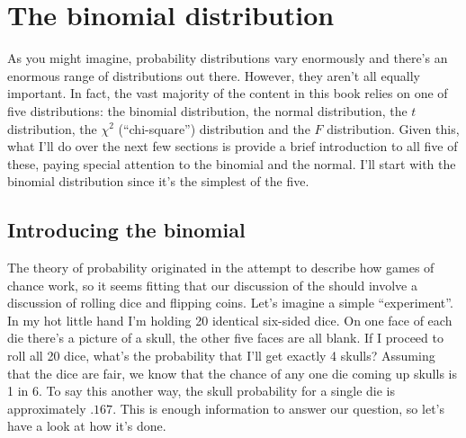 \section{The binomial distribution\label{sec:binomial}}

As you might imagine, probability distributions vary enormously and there's an enormous range of distributions out there. However, they aren't all equally important. In fact, the vast majority of the content in this book relies on one of five distributions: the binomial distribution, the normal distribution, the $t$ distribution, the $\chi^2$ (``chi-square'') distribution and the $F$ distribution. Given this, what I'll do over the next few sections is provide a brief introduction to all five of these, paying special attention to the binomial and the normal. I'll start with the binomial distribution since it's the simplest of the five.

\subsection{Introducing the binomial}

The theory of probability originated in the attempt to describe how games of chance work, so it seems fitting that our discussion of the  should involve a discussion of rolling dice and flipping coins. Let's imagine a simple ``experiment''. In my hot little hand I'm holding 20 identical six-sided dice. On one face of each die there's a picture of a skull, the other five faces are all blank. If I proceed to roll all 20 dice, what's the probability that I'll get exactly 4 skulls? Assuming that the dice are fair, we know that the chance of any one die coming up skulls is 1 in 6. To say this another way, the skull probability for a single die is approximately $.167$. This is enough information to answer our question, so let's have a look at how it's done. 


